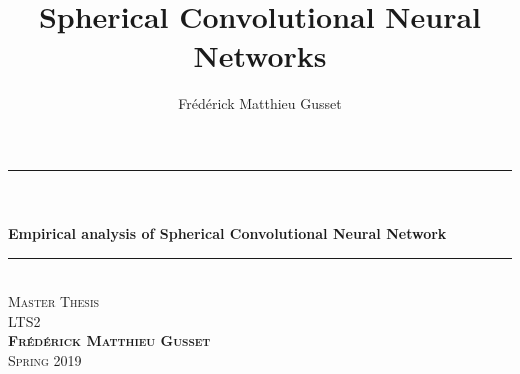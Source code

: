 \documentclass[11pt]{report}
\title{Spherical Convolutional Neural Networks}
\author{Frédérick Matthieu Gusset}
\makeatletter
\let\thetitle\@title
\makeatother
\begin{document}
\nocite{*}
\thispagestyle{empty}
\begin{center}
    \vspace*{0.5 cm}
    
	\rule{\linewidth}{0.2 mm} \\[0.4 cm]
    \vspace{10pt}
	{\huge \bfseries \thetitle}\\
    \vspace{10pt}
    { \large \bfseries Empirical analysis of Spherical Convolutional Neural Network }
    \vspace{10pt}%
    
	\rule{\linewidth}{0.2 mm} \\[1 cm]
	
	{\large %
	\textsc{Master Thesis\\[1 cm] LTS2}\\[1 cm]				%
    }
    \textsc{\bfseries Fr\'ed\'erick Matthieu Gusset}
	\\[1.7 cm]
	\textsc{Spring 2019} \\[2 cm]
\end{center}
\end{document}
